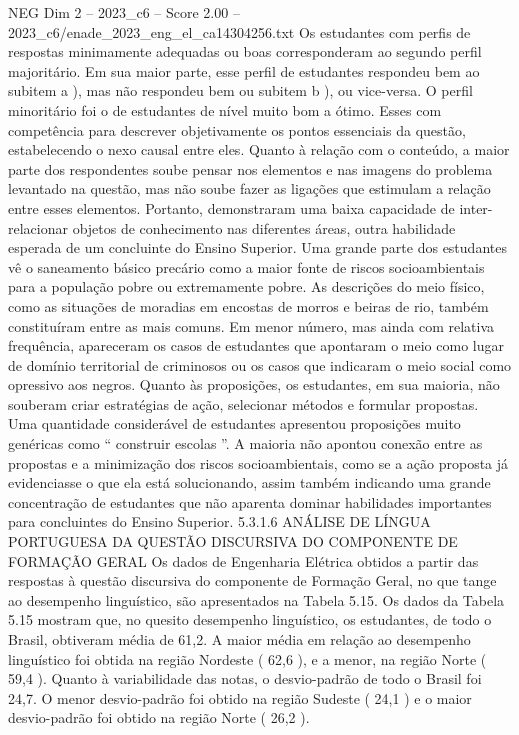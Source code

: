 \begin{textsample}{NEG Dim 2 – 2023\_c6 – Score 2.00 – 2023\_c6/enade\_2023\_eng\_el\_ca14304256.txt}
Os estudantes com perfis de respostas minimamente adequadas ou boas corresponderam ao segundo perfil majoritário.
Em sua maior parte, esse perfil de estudantes respondeu bem ao subitem a ), mas não respondeu bem ou subitem b ), ou vice-versa.
O perfil minoritário foi o de estudantes de nível muito bom a ótimo.
Esses com competência para descrever objetivamente os pontos essenciais da questão, estabelecendo o nexo causal entre eles.
Quanto à relação com o conteúdo, a maior parte dos respondentes soube pensar nos elementos e nas imagens do problema levantado na questão, mas não soube fazer as ligações que estimulam a relação entre esses elementos.
Portanto, demonstraram uma baixa capacidade de inter-relacionar objetos de conhecimento nas diferentes áreas, outra habilidade esperada de um concluinte do Ensino Superior.
Uma grande parte dos estudantes vê o saneamento básico precário como a maior fonte de riscos socioambientais para a população pobre ou extremamente pobre.
As descrições do meio físico, como as situações de moradias em encostas de morros e beiras de rio, também constituíram entre as mais comuns.
Em menor número, mas ainda com relativa frequência, apareceram os casos de estudantes que apontaram o meio como lugar de domínio territorial de criminosos ou os casos que indicaram o meio social como opressivo aos negros.
Quanto às proposições, os estudantes, em sua maioria, não souberam criar estratégias de ação, selecionar métodos e formular propostas.
Uma quantidade considerável de estudantes apresentou proposições muito genéricas como “ construir escolas ”.
A maioria não apontou conexão entre as propostas e a minimização dos riscos socioambientais, como se a ação proposta já evidenciasse o que ela está solucionando, assim também indicando uma grande concentração de estudantes que não aparenta dominar habilidades importantes para concluintes do Ensino Superior. 5.3.1.6 ANÁLISE DE LÍNGUA PORTUGUESA DA QUESTÃO DISCURSIVA DO COMPONENTE DE FORMAÇÃO GERAL Os dados de Engenharia Elétrica obtidos a partir das respostas à questão discursiva do componente de Formação Geral, no que tange ao desempenho linguístico, são apresentados na Tabela 5.15.
Os dados da Tabela 5.15 mostram que, no quesito desempenho linguístico, os estudantes, de todo o Brasil, obtiveram média de 61,2.
A maior média em relação ao desempenho linguístico foi obtida na região Nordeste ( 62,6 ), e a menor, na região Norte ( 59,4 ).
Quanto à variabilidade das notas, o desvio-padrão de todo o Brasil foi 24,7.
O menor desvio-padrão foi obtido na região Sudeste ( 24,1 ) e o maior desvio-padrão foi obtido na região Norte ( 26,2 ).

\end{textsample}
